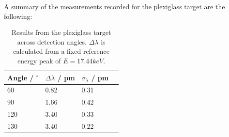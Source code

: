 \documentclass{article}%
\begin{document}
A summary of the measurements recorded for the plexiglass target are the following:
\begin{table}[H]
    \begin{centering}
    \begin{tabular}{|p{3cm}|p{3cm}|p{3cm}|p{3cm}|} 
        \hline
        Angle / $^\circ$ & $\Delta \lambda$ / pm & $\sigma_{\lambda}$ / pm  \\ [0.75ex] 
        \hline\hline
        60 & 0.82 & 0.31 \\ 
        \hline
        90 & 1.66 & 0.42 \\
        \hline
        120 & 3.40 & 0.33 \\
        \hline
        130 & 3.40 & 0.22 \\
        \hline
    \end{tabular}
    \caption{Results from the plexiglass target across detection angles. $\Delta \lambda$ is calculated from a fixed reference energy peak of $E=17.44keV$.}
    \end{centering} 
\end{table}
\end{document}
